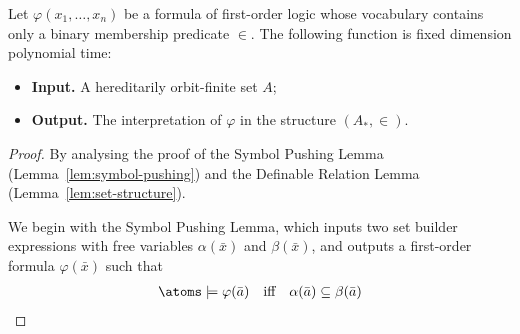 \begin{lemma}\label{thm:fdp-fo}
 Let $\varphi(x_1,\ldots,x_n)$ be a formula of first-order logic whose vocabulary contains only a binary membership predicate $\in$. The following function is fixed dimension polynomial time:
 \begin{itemize}
 \item {\bf Input.} A hereditarily orbit-finite set $A$;
 \item {\bf Output.} The interpretation of $\varphi$ in the structure $(A_*, \in)$.
 \end{itemize}
\end{lemma}
\begin{proof}
 By analysing the proof of the Symbol Pushing Lemma (Lemma~\ref{lem:symbol-pushing}) and the Definable Relation Lemma (Lemma~\ref{lem:set-structure}). 

 We begin with the Symbol Pushing Lemma, which inputs two set builder expressions with free variables $\alpha(\bar x)$ and $\beta(\bar x)$, and outputs a first-order formula $\varphi(\bar x)$ such that
	\begin{align*}
 \atoms \models \varphi(\bar a) \quad \text{iff} \quad \alpha (\bar a) \subseteq \beta (\bar a)
 \end{align*}



\end{proof}


